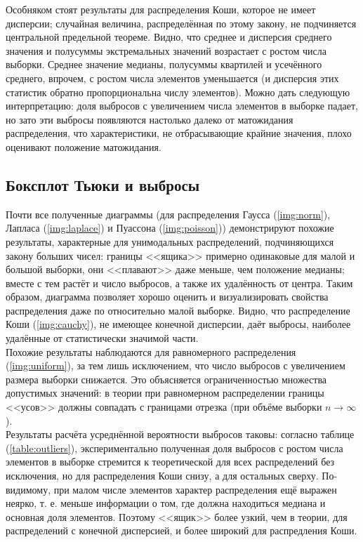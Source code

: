 \documentclass[zuev_report2.tex]{subfiles}
\begin{document}
Особняком стоят результаты для распределения Коши, которое не имеет дисперсии; случайная величина, распределённая по этому закону, не подчиняется центральной предельной теореме. Видно, что среднее и дисперсия среднего значения и полусуммы экстремальных значений возрастает с ростом числа выборки. Среднее значение медианы, полусуммы квартилей и усечённого среднего, впрочем,  с ростом числа элементов уменьшается (и дисперсия этих статистик обратно пропорциональна числу элементов). Можно дать следующую интерпретацию: доля выбросов с увеличением числа элементов в выборке падает, но зато эти выбросы появляются настолько далеко от матожидания распределения, что характеристики, не отбрасывающие крайние значения, плохо оценивают положение матожидания.

\subsection{Боксплот Тьюки и выбросы}
Почти все полученные диаграммы (для распределения Гаусса (\ref{img:norm}), Лапласа (\ref{img:laplace}) и Пуассона (\ref{img:poisson})) демонстрируют похожие результаты, характерные для унимодальных распределений, подчиняющихся закону больших чисел: границы <<ящика>> примерно одинаковые для малой и большой выборки, они <<плавают>> даже меньше, чем положение медианы; вместе с тем растёт и число выбросов, а также их удалённость от центра. Таким образом, диаграмма позволяет хорошо оценить и визуализировать свойства распределения даже по относительно малой выборке.  Видно, что распределение Коши (\ref{img:cauchy}), не имеющее конечной дисперсии, даёт выбросы, наиболее удалённые от статистически значимой части.\\
Похожие результаты наблюдаются для равномерного распределения (\ref{img:uniform}), за тем лишь исключением, что число выбросов с увеличением размера выборки снижается. Это объясняется ограниченностью множества допустимых значений: в теории при равномерном распределении границы <<усов>> должны совпадать с границами отрезка (при объёме выборки $n \rightarrow \infty$).\\
Результаты расчёта усреднённой вероятности выбросов таковы: согласно таблице (\ref{table:outliers}), экспериментально полученная доля выбросов с ростом числа элементов в выборке стремится к теоретической для всех распределений без исключения, но для распределения Коши снизу, а для остальных сверху. По-видимому, при малом числе элементов характер распределения ещё выражен неярко, т. е. меньше информации о том, где должна находиться медиана и основная доля элементов. Поэтому <<ящик>> более узкий, чем в теории, для распределений с конечной дисперсией, и более широкий для распредления Коши.\\  
\end{document}
